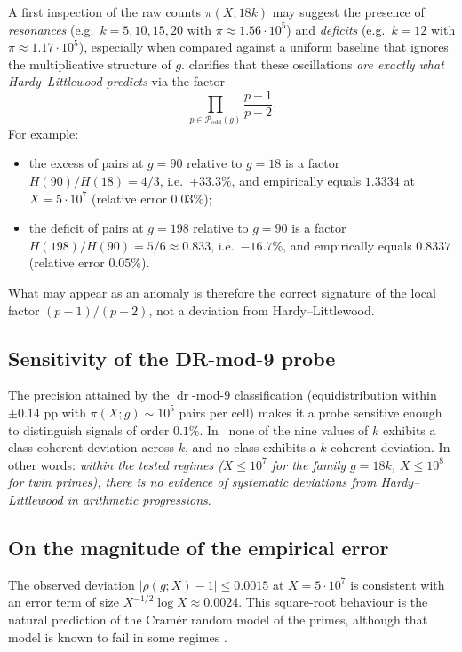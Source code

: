 \documentclass[11pt]{amsart}
\theoremstyle{plain}
\theoremstyle{definition}
\theoremstyle{remark}
\DeclareMathOperator{\dr}{dr}
\begin{document}
A first inspection of the raw counts $\pi(X;18k)$ may suggest the
presence of \emph{resonances} (e.g.\ $k = 5,10,15,20$ with
$\pi \approx 1.56 \cdot 10^5$) and \emph{deficits} (e.g.\ $k=12$ with
$\pi \approx 1.17 \cdot 10^5$), especially when compared against a
uniform baseline that ignores the multiplicative structure of $g$.
 clarifies that these oscillations \emph{are
exactly what Hardy--Littlewood predicts} via the factor
\[
  \prod_{p \in \mathcal{P}_{\mathrm{odd}}(g)} \frac{p-1}{p-2}.
\]
For example:
\begin{itemize}
\item the excess of pairs at $g=90$ relative to $g=18$ is a factor
  $H(90)/H(18) = 4/3$, i.e.\ $+33.3\%$, and empirically equals
  $1.3334$ at $X=5\cdot 10^7$ (relative error $0.03\%$);
\item the deficit of pairs at $g=198$ relative to $g=90$ is a factor
  $H(198)/H(90) = 5/6 \approx 0.833$, i.e.\ $-16.7\%$, and
  empirically equals $0.8337$ (relative error $0.05\%$).
\end{itemize}
What may appear as an anomaly is therefore the correct signature of
the local factor $(p-1)/(p-2)$, not a deviation from
Hardy--Littlewood.

\subsection{Sensitivity of the DR-mod-9 probe}

The precision attained by the $\dr$-mod-$9$ classification
(equidistribution within $\pm 0.14$ pp with $\pi(X;g) \sim 10^5$ pairs
per cell) makes it a probe sensitive enough to distinguish signals of
order $0.1\%$. In~ none of the nine values of $k$
exhibits a class-coherent deviation across $k$, and no class exhibits
a $k$-coherent deviation. In other words: \emph{within the tested
regimes ($X \le 10^7$ for the family $g=18k$, $X \le 10^8$ for twin
primes), there is no evidence of systematic deviations from
Hardy--Littlewood in arithmetic progressions}.

\subsection{On the magnitude of the empirical error}

The observed deviation $|\rho(g; X) - 1| \le 0.0015$ at $X = 5 \cdot 10^7$
is consistent with an error term of size $X^{-1/2} \log X \approx 0.0024$.
This square-root behaviour is the natural prediction of the Cram\'er
random model of the primes, although that model is known to fail in
some regimes \cite{Mai85}.
\end{document}
